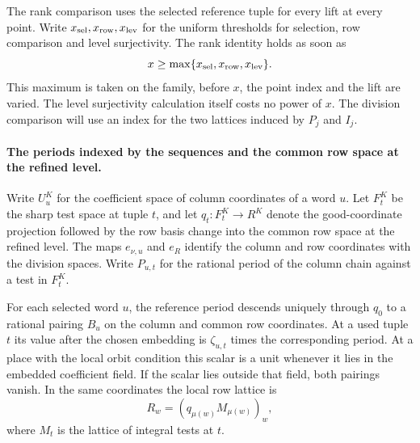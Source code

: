 The rank comparison uses the selected reference tuple for every
lift at every point. Write \(x_{\rm sel},x_{\rm row},x_{\rm lev}\) for the uniform
thresholds for selection, row comparison and level surjectivity.
The rank identity holds as soon as
\[
 x\ge\max\{x_{\rm sel},x_{\rm row},x_{\rm lev}\}.
\] This maximum is taken on
the family, before \(x\), the point index and the lift are
varied. The level surjectivity calculation itself costs no
power of \(x\). The division comparison will use an index
for the two lattices induced by \(P_j\) and \(I_j\).

\paragraph{The periods indexed by the sequences and the common row space at the refined level.}
Write \(U_u^K\) for the coefficient space of column
coordinates of a word \(u\). Let \(F_t^K\) be the sharp
test space at tuple \(t\), and let
\(q_t:F_t^K\to R^K\) denote the good-coordinate projection
followed by the row basis change into the common row space at the refined level. The maps \(e_{\nu,u}\) and \(e_R\) identify the column
and row coordinates with the division spaces. Write
\(P_{u,t}\) for the rational period of the column chain
against a test in \(F_t^K\).

\begin{proposition}\label{prop:common-rational-pairing}
For each selected word \(u\), the reference period descends uniquely
through \(q_0\) to a rational pairing \(B_u\) on the column and
common row coordinates. At a used tuple \(t\) its value after the
chosen embedding is \(\zeta_{u,t}\) times the corresponding period.
At a place with the local orbit condition this scalar is a unit
whenever it lies in the embedded coefficient field. If the scalar lies
outside that field, both pairings vanish. In the same coordinates the local row lattice is
\[
 R_w=(q_{\mu(w)}M_{\mu(w)})_w ,
\]
where \(M_t\) is the lattice of integral tests at \(t\).
\end{proposition}

